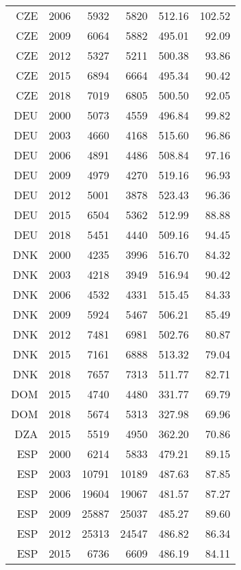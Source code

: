 \begin{longtable}{|r|r|r|r|r|r|}
    CZE   & 2006  & 5932  & 5820  & 512.16 & 102.52 \\
    CZE   & 2009  & 6064  & 5882  & 495.01 & 92.09 \\
    CZE   & 2012  & 5327  & 5211  & 500.38 & 93.86 \\
    CZE   & 2015  & 6894  & 6664  & 495.34 & 90.42 \\
    CZE   & 2018  & 7019  & 6805  & 500.50 & 92.05 \\
    DEU   & 2000  & 5073  & 4559  & 496.84 & 99.82 \\
    DEU   & 2003  & 4660  & 4168  & 515.60 & 96.86 \\
    DEU   & 2006  & 4891  & 4486  & 508.84 & 97.16 \\
    DEU   & 2009  & 4979  & 4270  & 519.16 & 96.93 \\
    DEU   & 2012  & 5001  & 3878  & 523.43 & 96.36 \\
    DEU   & 2015  & 6504  & 5362  & 512.99 & 88.88 \\
    DEU   & 2018  & 5451  & 4440  & 509.16 & 94.45 \\
    DNK   & 2000  & 4235  & 3996  & 516.70 & 84.32 \\
    DNK   & 2003  & 4218  & 3949  & 516.94 & 90.42 \\
    DNK   & 2006  & 4532  & 4331  & 515.45 & 84.33 \\
    DNK   & 2009  & 5924  & 5467  & 506.21 & 85.49 \\
    DNK   & 2012  & 7481  & 6981  & 502.76 & 80.87 \\
    DNK   & 2015  & 7161  & 6888  & 513.32 & 79.04 \\
    DNK   & 2018  & 7657  & 7313  & 511.77 & 82.71 \\
    DOM   & 2015  & 4740  & 4480  & 331.77 & 69.79 \\
    DOM   & 2018  & 5674  & 5313  & 327.98 & 69.96 \\
    DZA   & 2015  & 5519  & 4950  & 362.20 & 70.86 \\
    ESP   & 2000  & 6214  & 5833  & 479.21 & 89.15 \\
    ESP   & 2003  & 10791 & 10189 & 487.63 & 87.85 \\
    ESP   & 2006  & 19604 & 19067 & 481.57 & 87.27 \\
    ESP   & 2009  & 25887 & 25037 & 485.27 & 89.60 \\
    ESP   & 2012  & 25313 & 24547 & 486.82 & 86.34 \\
    ESP   & 2015  & 6736  & 6609  & 486.19 & 84.11 \\

\end{longtable}
